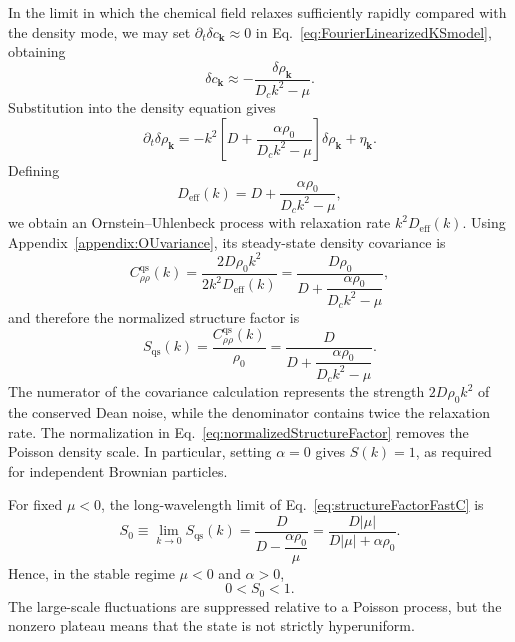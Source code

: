 \documentclass{article}
\begin{document}
In the limit in which the chemical field relaxes sufficiently rapidly compared with the density mode, we may set $\partial_t\delta c_{\mathbf k}\approx0$ in Eq.~\eqref{eq:FourierLinearizedKSmodel}, obtaining
\begin{equation}
    \delta c_{\mathbf k}\approx-\frac{\delta\rho_{\mathbf k}}{D_ck^2-\mu}.
\end{equation}
Substitution into the density equation gives
\begin{equation}
    \partial_t\delta\rho_{\mathbf k}
    =-k^2\left[D+\frac{\alpha\rho_0}{D_ck^2-\mu}\right]\delta\rho_{\mathbf k}
    +\eta_{\mathbf k}.
\end{equation}
Defining
\begin{equation}
    D_{\mathrm{eff}}(k)=D+\frac{\alpha\rho_0}{D_ck^2-\mu},
\end{equation}
we obtain an Ornstein--Uhlenbeck process with relaxation rate $k^2D_{\mathrm{eff}}(k)$. Using Appendix~\ref{appendix:OUvariance}, its steady-state density covariance is
\begin{equation}
    C_{\rho\rho}^{\mathrm{qs}}(k)
    =\frac{2D\rho_0k^2}{2k^2D_{\mathrm{eff}}(k)}
    =\frac{D\rho_0}{D+\dfrac{\alpha\rho_0}{D_ck^2-\mu}},
    \label{eq:densitySpectrumFastC}
\end{equation}
and therefore the normalized structure factor is
\begin{equation}
    \boxed{
    S_{\mathrm{qs}}(k)
    =\frac{C_{\rho\rho}^{\mathrm{qs}}(k)}{\rho_0}
    =\frac{D}{D+\dfrac{\alpha\rho_0}{D_ck^2-\mu}}
    }.
    \label{eq:structureFactorFastC}
\end{equation}
The numerator of the covariance calculation represents the strength $2D\rho_0k^2$ of the conserved Dean noise, while the denominator contains twice the relaxation rate. The normalization in Eq.~\eqref{eq:normalizedStructureFactor} removes the Poisson density scale. In particular, setting $\alpha=0$ gives $S(k)=1$, as required for independent Brownian particles.

For fixed $\mu<0$, the long-wavelength limit of Eq.~\eqref{eq:structureFactorFastC} is
\begin{equation}
    S_0\equiv\lim_{k\to0}S_{\mathrm{qs}}(k)
    =\frac{D}{D-\dfrac{\alpha\rho_0}{\mu}}
    =\frac{D|\mu|}{D|\mu|+\alpha\rho_0}.
    \label{eq:Sk0FastC}
\end{equation}
Hence, in the stable regime $\mu<0$ and $\alpha>0$,
\begin{equation}
    0<S_0<1.
\end{equation}
The large-scale fluctuations are suppressed relative to a Poisson process, but the nonzero plateau means that the state is not strictly hyperuniform.
\end{document}
